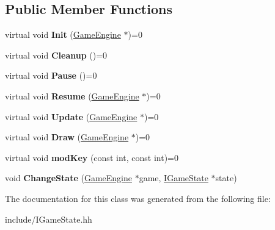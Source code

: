 \subsection*{Public Member Functions}
\begin{DoxyCompactItemize}
\item 
\hypertarget{class_i_game_state_af86b4f2fc9f78853adece509e3fbc3cc}{}virtual void {\bfseries Init} (\hyperlink{class_game_engine}{Game\+Engine} $\ast$)=0\label{class_i_game_state_af86b4f2fc9f78853adece509e3fbc3cc}

\item 
\hypertarget{class_i_game_state_a231dd43ee1b05724a3fa71ea2c4496eb}{}virtual void {\bfseries Cleanup} ()=0\label{class_i_game_state_a231dd43ee1b05724a3fa71ea2c4496eb}

\item 
\hypertarget{class_i_game_state_adaa3df47002fddb3799a5681a0d7107a}{}virtual void {\bfseries Pause} ()=0\label{class_i_game_state_adaa3df47002fddb3799a5681a0d7107a}

\item 
\hypertarget{class_i_game_state_a0d8a3a107333e43cc30d49477ffe06d8}{}virtual void {\bfseries Resume} (\hyperlink{class_game_engine}{Game\+Engine} $\ast$)=0\label{class_i_game_state_a0d8a3a107333e43cc30d49477ffe06d8}

\item 
\hypertarget{class_i_game_state_afb18c1ad4d825f87f3338707a7e1bcad}{}virtual void {\bfseries Update} (\hyperlink{class_game_engine}{Game\+Engine} $\ast$)=0\label{class_i_game_state_afb18c1ad4d825f87f3338707a7e1bcad}

\item 
\hypertarget{class_i_game_state_af74daf4571a1a35c1d284d1e480b080c}{}virtual void {\bfseries Draw} (\hyperlink{class_game_engine}{Game\+Engine} $\ast$)=0\label{class_i_game_state_af74daf4571a1a35c1d284d1e480b080c}

\item 
\hypertarget{class_i_game_state_a76e371cd2b12b540f22db257660fb5f2}{}virtual void {\bfseries mod\+Key} (const int, const int)=0\label{class_i_game_state_a76e371cd2b12b540f22db257660fb5f2}

\item 
\hypertarget{class_i_game_state_ad9d20c326c13b8ee78ac3ac9cde6eab6}{}void {\bfseries Change\+State} (\hyperlink{class_game_engine}{Game\+Engine} $\ast$game, \hyperlink{class_i_game_state}{I\+Game\+State} $\ast$state)\label{class_i_game_state_ad9d20c326c13b8ee78ac3ac9cde6eab6}

\end{DoxyCompactItemize}


The documentation for this class was generated from the following file\+:\begin{DoxyCompactItemize}
\item 
include/I\+Game\+State.\+hh\end{DoxyCompactItemize}
